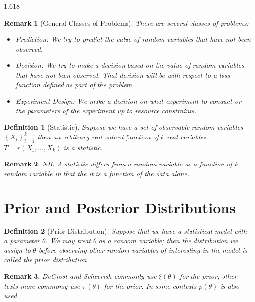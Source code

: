 \documentclass[11pt, oneside]{book}   	%
\newtheorem{definition}{Definition}[chapter]
\newtheorem{remark}{Remark}[chapter]
\newcommand{\set}[1]{\left\{#1\right\}}
\begin{document}
\begin{spacing}{1.618}
		\begin{remark}[General Classes of Problems]
			There are several classes of problems:
			\begin{itemize} 				
				\item \emph{Prediction}: We try to predict the value of random variables that have not been observed. 
				\item \emph{Decision}: We try to make a decision based on the value of random variables that have not been observed. That decision will be with respect to a loss function defined as part of the problem.
				\item \emph{Experiment Design}: We make a decision on what experiment to conduct or the parameters of the experiment up to resource constraints. 
			\end{itemize}
		\end{remark}
		
		\begin{definition}[Statistic]
			Suppose we have a set of \emph{observable} random variables $\set{X_i}_{i=1}^k$ then an arbitrary real valued function of $k$ real variables $T=r(X_1, \dots, X_k)$ is a statistic. 
		\end{definition}
		
		\begin{remark}
			NB: A statistic differs from a random variable as a function of $k$ random variable in that the it is a function of the data alone.
		\end{remark}
		
	\section{Prior and Posterior Distributions}
	
		\begin{definition}[Prior Distribution]
			Suppose that we have a statistical model with a parameter $\theta$. We may treat $\theta$ as a random variable; then the distribution we assign to $\theta$ before observing other random variables of interesting in the model is called the \emph{prior distribution}
		\end{definition}
		
		\begin{remark}
			DeGroot and Schevrish commonly use $\xi(\theta)$ for the prior, other texts more commonly use $\pi(\theta)$ for the prior. In some contexts $p(\theta)$ is also used. 
		\end{remark}
		

\end{spacing}
\end{document}
